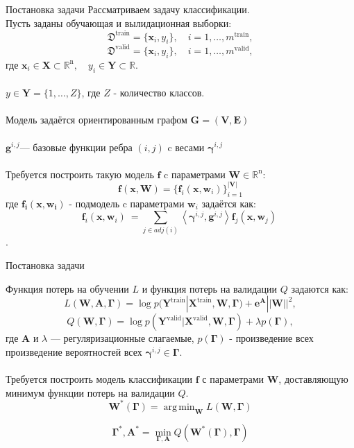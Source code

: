 \documentclass[10pt]{beamer}
\DeclareMathOperator*{\argmin}{arg\,min}
\begin{document}
\begin{frame}{Постановка задачи}
Рассматриваем задачу классификации.\\
Пусть заданы обучающая и вылидационная выборки:
\[
\mathfrak{D}^{\text{train}} = \{\mathbf{x}_i, y_i\}, \quad i=1,\dots,m^{\text{train}},
\]
\[
\mathfrak{D}^{\text{valid}} = \{\mathbf{x}_i, y_i\}, \quad i=1,\dots,m^{\text{valid}},
\]
 где $\mathbf{x}_i\in\mathbf{X}\subset\mathbb{R}^{\text{n}},\quad y_i\in\mathbf{Y}\subset\mathbb{R}.$\\
~\\
$y\in\mathbf{Y}= \{1,\dots,Z\}$, где $Z$ - количество классов.\\
~\\
Модель задаётся ориентированным графом $\mathbf{G=(V,E)}$\\
~\\
$\mathbf{g}^{i,j} $--- базовые функции ребра $(i, j) $ c весами $\boldsymbol{\gamma}^{i,j}$\\
~\\
Требуется построить такую модель $\mathbf{f}$ c параметрами $\mathbf{W}\in\mathbb{R}^\text{n}$:
\[
\mathbf{f}(\mathbf{x}, \mathbf{W})= \{ \mathbf{f}_i(\mathbf{x}, \mathbf{w}_i)\}_{i=1}^\mathbf{|V|}
\]
где $\mathbf{f_i(x, w_i)}$ - подмодель c параметрами $\mathbf{w}_i$ задаётся как:
\[
\mathbf{f}_i(\mathbf{x}, \mathbf{w}_i)\ = \sum_{j\in adj(i)} \left\langle {\boldsymbol{\gamma}^{i,j}, \mathbf{g}^{i,j}} \right\rangle \mathbf{f}_j(\mathbf{x}, \mathbf{w}_j)\
\].


\end{frame}


\begin{frame}{Постановка задачи}

Функция потерь на обучении $L$ и функция потерь на валидации $Q$ задаются как:
\[
L (\mathbf{W}, \mathbf{A}, \boldsymbol{\Gamma})= \log p(\mathbf{Y}^\text{train}|\mathbf{X}^\text{train}, \mathbf{W}, \boldsymbol{\Gamma}) + \boldsymbol{e}^{\mathbf{A}}||\mathbf{W}||^2,
\]
\[
Q (\mathbf{W}, \boldsymbol{\Gamma})= \log p(\mathbf{Y}^\text{valid}|\mathbf{X}^\text{valid}, \mathbf{W}, \boldsymbol{\Gamma}) + \lambda p(\boldsymbol{\Gamma}),
\]
где $\mathbf{A}$ и $\lambda$ --- регуляризационные слагаемые, $p(\boldsymbol{\Gamma})$ - произведение всех произведение вероятностей всех $\boldsymbol{\gamma}^{i,j} \in \boldsymbol{\Gamma}$. \\
~\\
Требуется построить модель классификации $\mathbf{f}$ с параметрами $\mathbf{W}$, доставляющую минимум функции потерь на валидации $Q$.
\[
\mathbf{W}^*( \boldsymbol{\Gamma}) = \argmin_{\mathbf{W}}
L (\mathbf{W}, \boldsymbol{\Gamma})\]

\[
\boldsymbol{\Gamma}^*, \mathbf{A}^* = \min_{\boldsymbol{\Gamma}, \mathbf{A}} Q (\mathbf{W}^*( \boldsymbol{\Gamma}), \boldsymbol{\Gamma})
\]



\end{frame}
\end{document}
